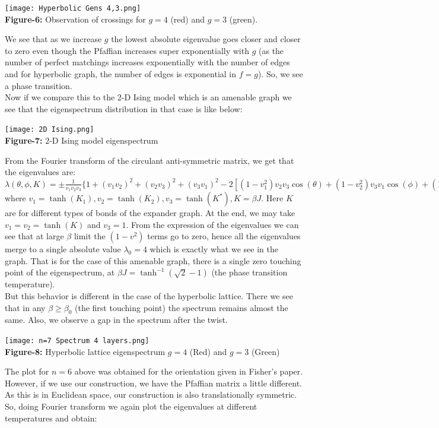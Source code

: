 \documentclass{article}
\begin{document}
	
	\begin{center}
		\texttt{[image: Hyperbolic Gens 4,3.png]}\\
		\textbf{Figure-6:} Observation of crossings for $g=4$ (red) and $g=3$ (green).\\
	\end{center}
	
	We see that as we increase $g$ the lowest absolute eigenvalue goes closer and closer to zero even though the Pfaffian increases super exponentially with $g$ (as the number of perfect matchings increases exponentially with the number of edges and for hyperbolic graph, the number of edges is exponential in $f=g$). So, we see a phase transition. \\
	
	Now if we compare this to the 2-D Ising model which is an amenable graph we see that the eigenspectrum distribution in that case is like below:\\
	\begin{center}
		\texttt{[image: 2D Ising.png]}\\
		\textbf{Figure-7:} $2$-D Ising model eigenspectrum\\
	\end{center}
	From the Fourier transform of the circulant anti-symmetric matrix, we get that the eigenvalues are: $\lambda(\theta, \phi, K)=\pm \frac{1}{v_1v_2v_3}\{1+(v_1v_2)^2+(v_2v_3)^2+(v_3v_1)^2-2[(1-v_1^2)v_2v_3\cos(\theta)+(1-v_2^2)v_3v_1\cos(\phi)+(1-v_3^2)v_1v_2\cos(2\pi-\theta-\phi)]\}$ where $v_1=\tanh(K_1), v_2=\tanh(K_2), v_3=\tanh(K^{*}), K=\beta J$. Here $K$ are for different types of bonds of the expander graph. At the end, we may take $v_1=v_2=\tanh(K)$ and $v_3=1$. From the expression of the eigenvalues we can see that at large $\beta$ limit the $(1-v^2)$ terms go to zero, hence all the eigenvalues merge to a single absolute value $\lambda_0=4$ which is exactly what we see in the graph. That is for the case of this amenable graph, there is a single zero touching point of the eigenspectrum, at $\beta J=\tanh^{-1}(\sqrt{2}-1)$ (the phase transition temperature).\\
	
	But this behavior is different in the case of the hyperbolic lattice. There we see that in any $\beta \geq \beta_0$ (the first touching point) the spectrum remains almost the same. Also, we observe a gap in the spectrum after the twist. \\
	
	\begin{center}
		\texttt{[image: n=7 Spectrum 4 layers.png]}\\
		\textbf{Figure-8:} Hyperbolic lattice eigenspectrum $g=4$ (Red) and $g=3$ (Green)\\
	\end{center}
	\vspace{0.2 cm}
	The plot for $n=6$ above was obtained for the orientation given in Fisher's paper. However, if we use our construction, we have the Pfaffian matrix a little different. As this is in Euclidean space, our construction is also translationally symmetric. So, doing Fourier transform we again plot the eigenvalues at different temperatures and obtain:
	
\end{document}
